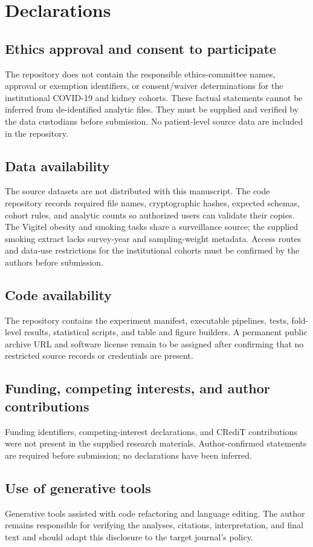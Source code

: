 \section*{Declarations}

\subsection*{Ethics approval and consent to participate}

The repository does not contain the responsible ethics-committee names, approval or exemption identifiers, or consent/waiver determinations for the institutional COVID-19 and kidney cohorts. These factual statements cannot be inferred from de-identified analytic files. They must be supplied and verified by the data custodians before submission. No patient-level source data are included in the repository.

\subsection*{Data availability}

The source datasets are not distributed with this manuscript. The code repository records required file names, cryptographic hashes, expected schemas, cohort rules, and analytic counts so authorized users can validate their copies. The Vigitel obesity and smoking tasks share a surveillance source; the supplied smoking extract lacks survey-year and sampling-weight metadata. Access routes and data-use restrictions for the institutional cohorts must be confirmed by the authors before submission.

\subsection*{Code availability}

The repository contains the experiment manifest, executable pipelines, tests, fold-level results, statistical scripts, and table and figure builders. A permanent public archive URL and software license remain to be assigned after confirming that no restricted source records or credentials are present.

\subsection*{Funding, competing interests, and author contributions}

Funding identifiers, competing-interest declarations, and CRediT contributions were not present in the supplied research materials. Author-confirmed statements are required before submission; no declarations have been inferred.

\subsection*{Use of generative tools}

Generative tools assisted with code refactoring and language editing. The author remains responsible for verifying the analyses, citations, interpretation, and final text and should adapt this disclosure to the target journal's policy.
